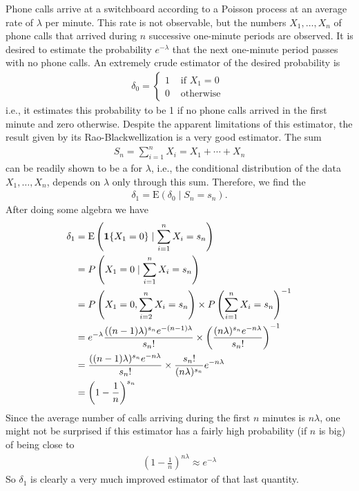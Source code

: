 \documentclass{article}
\begin{document}
\begin{exma}
  Phone calls arrive at a switchboard according to a Poisson process at an average rate of $\lambda$ per minute. This rate is not observable, but the numbers $X_{1}, \ldots, X_{n}$ of phone calls that arrived during $n$ successive one-minute periods are observed. It is desired to estimate the probability $e^{-\lambda}$ that the next one-minute period passes with no phone calls.
An extremely crude estimator of the desired probability is
\begin{align*}
\delta_{0}= \begin{cases}1 & \text { if } X_{1}=0 \\ 0 & \text { otherwise }\end{cases}
\end{align*}
i.e., it estimates this probability to be 1 if no phone calls arrived in the first minute and zero otherwise. Despite the apparent limitations of this estimator, the result given by its Rao-Blackwellization is a very good estimator.
The sum
\begin{align*}
S_{n}=\sum_{i=1}^{n} X_{i}=X_{1}+\cdots+X_{n}
\end{align*}
can be readily shown to be a  for $\lambda$, i.e., the conditional distribution of the data $X_{1}, \ldots, X_{n}$, depends on $\lambda$ only through this sum. Therefore, we find the 
\begin{align*}
\delta_{1}=\mathrm{E}\left(\delta_{0} \mid S_{n}=s_{n}\right) .
\end{align*}
After doing some algebra we have
\begin{align*}
\begin{aligned}
\delta_{1} &=\mathrm{E}\left(\indicate{X_{1}=0} \mid \sum_{i=1}^{n} X_{i}=s_{n}\right) \\
&=P\left(X_{1}=0 \mid \sum_{i=1}^{n} X_{i}=s_{n}\right) \\
&=P\left(X_{1}=0, \sum_{i=2}^{n} X_{i}=s_{n}\right) \times P\left(\sum_{i=1}^{n} X_{i}=s_{n}\right)^{-1} \\
&=e^{-\lambda} \frac{((n-1) \lambda)^{s_{n}} e^{-(n-1) \lambda}}{s_{n} !} \times\left(\frac{(n \lambda)^{s_{n}} e^{-n \lambda}}{s_{n} !}\right)^{-1} \\
&=\frac{((n-1) \lambda)^{s_{n}} e^{-n \lambda}}{s_{n} !} \times \frac{s_{n} !}{(n \lambda)^{s_{n}}} e^{-n \lambda} \\
&=\left(1-\frac{1}{n}\right)^{s_{n}}
\end{aligned}
\end{align*}
Since the average number of calls arriving during the first $n$ minutes is $n \lambda$, one might not be surprised if this estimator has a fairly high probability (if $n$ is big) of being close to
\begin{align*}
\left(1-\frac{1}{n}\right)^{n \lambda} \approx e^{-\lambda}
\end{align*}
So $\delta_{1}$ is clearly a very much improved estimator of that last quantity.
\end{exma}
\end{document}
